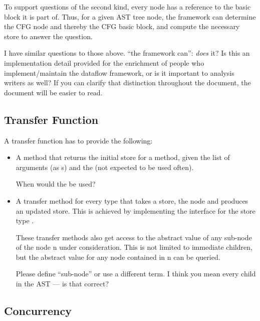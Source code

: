 To support questions of the second kind, every node has a reference
to the basic block it is part of. Thus, for a given AST tree node, the framework
can determine the CFG node and thereby the CFG basic block, and compute the necessary store
to answer the question.

\begin{workinprogress}
I have similar questions to those above.  ``the framework can'':
\emph{does} it?  Is this an implementation detail provided for the
enrichment of people who implement/maintain the dataflow framework, or is
it important to analysis writers as well?  If you can clarify that distinction
throughout the document, the document will be easier to read.
\end{workinprogress}


\subsection{Transfer Function}
\label{sec:transfer-fnc}

A transfer function has to provide the following:
\begin{itemize}
\item A method that returns the initial store for a method, given
the list of arguments (as s)
and the  (not expected to be used often).

\begin{workinprogress}
When would the  be used?
\end{workinprogress}

\item A transfer method for every  type that takes a store, the node and produces
an updated store. This is achieved by implementing the  interface
for the store type .

These transfer methods also get access to the abstract value of any sub-node of the node \code n
under consideration.  This is not limited to immediate children, but the abstract value for any node contained
in \code n can be queried.

\begin{workinprogress}
Please define ``sub-node'' or use a different term.  I think you mean every
child in the AST --- is that correct?
\end{workinprogress}

\end{itemize}


\subsection{Concurrency}

